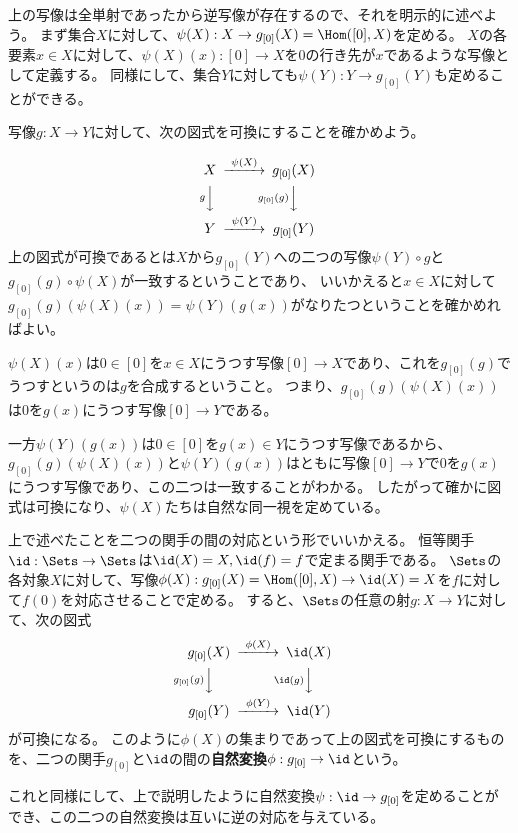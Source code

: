 \documentclass{jsarticle}
\begin{document}
\vspace{10pt}
上の写像は全単射であったから逆写像が存在するので、それを明示的に述べよう。
まず集合$X$に対して、$\psi(X):X \to g_{[0]}(X)=\Hom([0],X)$を定める。
$X$の各要素$x\in X$に対して、$\psi(X)(x):[0] \to X$を$0$の行き先が$x$であるような写像として定義する。
同様にして、集合$Y$に対しても$\psi(Y):Y \to g_{[0]}(Y)$も定めることができる。

写像$g:X \to Y$に対して、次の図式を可換にすることを確かめよう。

\[
\begin{CD}
X@>\psi(X)>>g_{[0]}(X)\\
@VgVV@Vg_{[0]}(g)VV\\
Y@>\psi(Y)>>g_{[0]}(Y)
\end{CD}
\]
上の図式が可換であるとは$X$から$g_{[0]}(Y)$への二つの写像$\psi(Y)\circ g$と$g_{[0]}(g)\circ \psi(X)$が一致するということであり、
いいかえると$x\in X$に対して$g_{[0]}(g)(\psi(X)(x))=\psi(Y)(g(x))$がなりたつということを確かめればよい。

$\psi(X)(x)$は$0\in[0]$を$x\in X$にうつす写像$[0] \to X$であり、これを$g_{[0]}(g)$でうつすというのは$g$を合成するということ。
つまり、$g_{[0]}(g)(\psi(X)(x))$は$0$を$g(x)$にうつす写像$[0] \to Y$である。

一方$\psi(Y)(g(x))$は$0 \in [0]$を$g(x) \in Y$にうつす写像であるから、$g_{[0]}(g)(\psi(X)(x))$と$\psi(Y)(g(x))$はともに写像$[0] \to Y$で$0$を$g(x)$にうつす写像であり、この二つは一致することがわかる。
したがって確かに図式は可換になり、$\psi(X)$たちは自然な同一視を定めている。

\vspace{10pt}
上で述べたことを二つの関手の間の対応という形でいいかえる。
恒等関手$\id:\Sets\to \Sets$は$\id(X)=X, \id(f)=f$で定まる関手である。
$\Sets$の各対象$X$に対して、写像$\phi(X):g_{[0]}(X)=\Hom([0],X) \to \id(X)=X$を$f$に対して$f(0)$を対応させることで定める。
すると、$\Sets$の任意の射$g:X \to Y$に対して、次の図式
\[
\begin{CD}
g_{[0]}(X)@>\phi(X)>>\id(X)\\
@Vg_{[0]}(g)VV@V\id(g)VV\\
g_{[0]}(Y)@>\phi(Y)>>\id(Y)
\end{CD}
\]
が可換になる。
このように$\phi(X)$の集まりであって上の図式を可換にするものを、二つの関手$g_{[0]}$と$\id$の間の\textbf{自然変換}$\phi:g_{[0]} \to \id$という。

これと同様にして、上で説明したように自然変換$\psi:\id \to g_{[0]}$を定めることができ、この二つの自然変換は互いに逆の対応を与えている。
\end{document}
